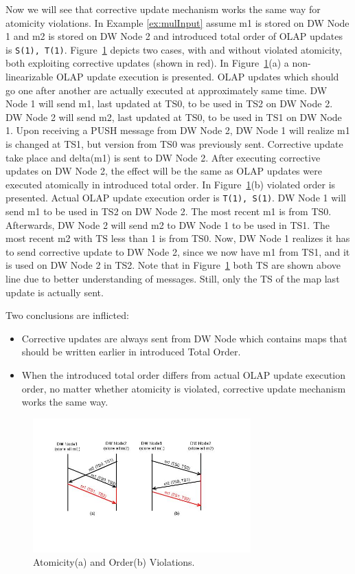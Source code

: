 \documentclass{sig-semester}
\def\OLAP{OLAP\xspace}
\def\EXORD{actual OLAP update execution order\xspace}
\begin{document}
Now we will see that corrective update mechanism works the same way for atomicity violations. In Example \ref{ex:mulInput} assume m1 is stored on DW Node 1 and m2 is stored on DW Node 2 and introduced total order of \OLAP updates is \texttt{S(1), T(1)}. Figure~\ref{fig:Atomicity} depicts two cases, with and without violated atomicity, both exploiting corrective updates (shown in red). In Figure~\ref{fig:Atomicity}(a) a non-linearizable \OLAP update execution is presented. \OLAP updates which should go one after another are actually executed at approximately same time. DW Node 1 will send m1, last updated at TS0, to be used in TS2 on DW Node 2. DW Node 2 will send m2, last updated at TS0, to be used in TS1 on DW Node 1. Upon receiving a PUSH message from DW Node 2, DW Node 1 will realize m1 is changed at TS1, but version from TS0 was previously sent. Corrective update take place and delta(m1) is sent to DW Node 2. After executing corrective updates on DW Node 2, the effect will be the same as \OLAP updates were executed atomically in introduced total order. In Figure~\ref{fig:Atomicity}(b) violated order is presented. Actual \OLAP update execution order is \texttt{T(1), S(1)}. DW Node 1 will send m1 to be used in TS2 on DW Node 2. The most recent m1 is from TS0. Afterwards, DW Node 2 will send m2 to DW Node 1 to be used in TS1. The most recent m2 with TS less than 1 is from TS0. Now, DW Node 1 realizes it has to send corrective update to DW Node 2, since we now have m1 from TS1, and it is used on DW Node 2 in TS2. Note that in Figure~\ref{fig:Atomicity} both TS are shown above line due to better understanding of messages. Still, only the TS of the map last update is actually sent.

Two conclusions are inflicted:
\begin{itemize}
 \item Corrective updates are always sent from DW Node which contains maps that should be written earlier in introduced Total Order.

 \item When the introduced total order differs from \EXORD, no matter whether atomicity is violated, corrective update mechanism works the same way. 
\end{itemize} 

\begin{figure}
\includegraphics[width=3.3in]{AtomicityOrder.jpg}
\vspace{-18mm}
\caption{Atomicity(a) and Order(b) Violations.}
\label{fig:Atomicity}
\vspace{-5mm}
\end{figure}
\end{document}

